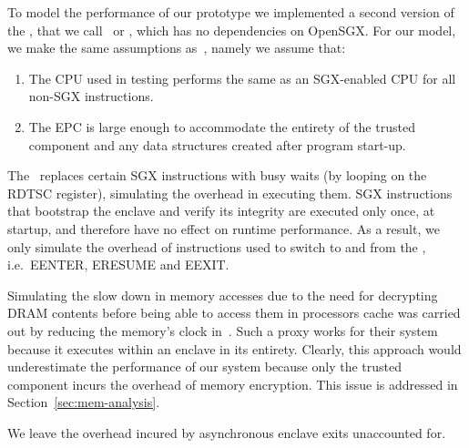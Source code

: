 \documentclass[../../../main.tex]{subfiles}
\begin{document}
\label{sec:perfmodel}
To model the performance of our prototype we implemented a second version of
the \enclaveprogram, that we call \busywait~or \enclavemodel, which
has no dependencies on OpenSGX. For our model, we make the same assumptions
as~\cite{Baumann14}, namely we assume that:
\begin{enumerate}
  \item The CPU used in testing performs the same as an SGX-enabled CPU for
    all non-SGX instructions.
  \item The EPC is large enough to accommodate the entirety of the trusted
    component and any data structures created after program start-up.
\end{enumerate}

The \busywait~replaces certain SGX instructions with busy waits (by looping on
the RDTSC register), simulating the overhead in executing them. SGX
instructions that bootstrap the enclave and verify its integrity are executed
only once, at startup, and therefore have no effect on runtime performance. As
a result, we only simulate the overhead of instructions used to switch to and
from the \enclaveprogram, i.e.\ EENTER, ERESUME and EEXIT.

Simulating the slow down in memory accesses due to the need for decrypting
DRAM contents before being able to access them in processors cache was carried
out by reducing the memory's clock in~\cite{Baumann14}. Such a proxy works for
their system because it executes within an enclave in its entirety. Clearly,
this approach would underestimate the performance of our system because only
the trusted component incurs the overhead of memory encryption. This issue is
addressed in Section~\ref{sec:mem-analysis}.

We leave the overhead incured by asynchronous enclave exits unaccounted for.
\end{document}
